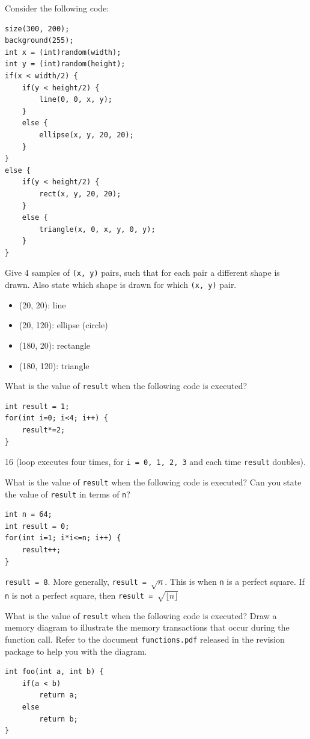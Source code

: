 \begin{questions}
\question Consider the following code:
\begin{lstlisting}
size(300, 200);
background(255);
int x = (int)random(width);
int y = (int)random(height);
if(x < width/2) {
	if(y < height/2) {
		line(0, 0, x, y);
	}
	else {
		ellipse(x, y, 20, 20);
	}
}
else {
	if(y < height/2) {
		rect(x, y, 20, 20);
	}
	else {
		triangle(x, 0, x, y, 0, y);
	}
}
\end{lstlisting}

Give 4 samples of \texttt{(x, y)} pairs, such that for each pair a different shape is drawn. Also state which shape is drawn for which \texttt{(x, y)} pair.
\begin{solution}
\begin{itemize}
	\item (20, 20): line
	\item (20, 120): ellipse (circle)
	\item (180, 20): rectangle
	\item (180, 120): triangle
\end{itemize}
\end{solution}

\question What is the value of \texttt{result} when the following code is executed?
\begin{lstlisting}
int result = 1;
for(int i=0; i<4; i++) {
	result*=2;
}
\end{lstlisting}

\begin{solution}
16 (loop executes four times, for \texttt{i = 0, 1, 2, 3} and each time \texttt{result} doubles).
\end{solution}

\question What is the value of \texttt{result} when the following code is executed? Can you state the value of \texttt{result} in terms of \texttt{n}?
\begin{lstlisting}
int n = 64;
int result = 0;
for(int i=1; i*i<=n; i++) {
	result++;
}
\end{lstlisting}

\begin{solution}
\texttt{result = 8}. More generally, \texttt{result = }$\sqrt{{n}}$. This is when \texttt{n} is a perfect square. If \texttt{n} is not a perfect square, then \texttt{result = }$\sqrt{{\lfloor n \rfloor}}$
\end{solution}

\question What is the value of \texttt{result} when the following code is executed? Draw a memory diagram to illustrate the memory transactions that occur during the function call. Refer to the document \texttt{functions.pdf} released in the revision package to help you with the diagram.
\begin{lstlisting}
int foo(int a, int b) {
	if(a < b)
		return a;
	else
		return b;
}
\end{lstlisting}


\end{questions}
